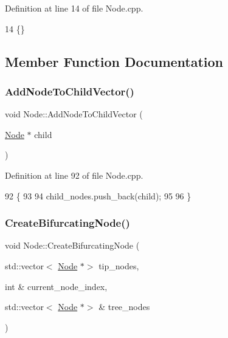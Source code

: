 Definition at line 14 of file Node.\+cpp.


\begin{DoxyCode}
14 \{\}
\end{DoxyCode}


\subsection{Member Function Documentation}
\mbox{\label{classNode_aef73af92aa3046218f83ed67a7996188}} 
\subsubsection{\texorpdfstring{Add\+Node\+To\+Child\+Vector()}{AddNodeToChildVector()}}
{\footnotesize\ttfamily void Node\+::\+Add\+Node\+To\+Child\+Vector (\begin{DoxyParamCaption}\item[{\hyperlink{classNode}{Node} $\ast$}]{child }\end{DoxyParamCaption})}



Definition at line 92 of file Node.\+cpp.


\begin{DoxyCode}
92                                           \{
93   
94   child\_nodes.push\_back(child);
95   
96 \}
\end{DoxyCode}
\mbox{\label{classNode_aed21bd99e0d680ea7c6a1524e989b9d4}} 
\subsubsection{\texorpdfstring{Create\+Bifurcating\+Node()}{CreateBifurcatingNode()}}
{\footnotesize\ttfamily void Node\+::\+Create\+Bifurcating\+Node (\begin{DoxyParamCaption}\item[{std\+::vector$<$ \hyperlink{classNode}{Node} $\ast$$>$}]{tip\+\_\+nodes,  }\item[{int \&}]{current\+\_\+node\+\_\+index,  }\item[{std\+::vector$<$ \hyperlink{classNode}{Node} $\ast$$>$ \&}]{tree\+\_\+nodes }\end{DoxyParamCaption})}

